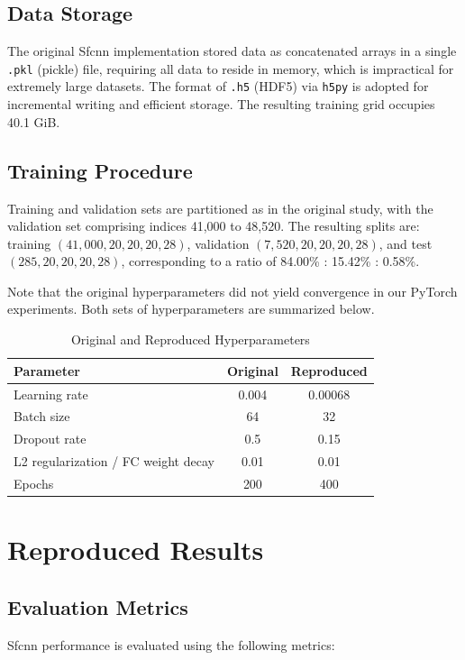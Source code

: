 \documentclass[unnumsec,webpdf,contemporary,large]{oup-authoring-template}
\theoremstyle{thmstyleone}%
\theoremstyle{thmstyletwo}%
\theoremstyle{thmstylethree}%
\begin{document}
\subsection{Data Storage}
The original Sfcnn implementation stored data as concatenated arrays in a single \texttt{.pkl} (pickle) file, requiring all data to reside in memory, which is impractical for extremely large datasets. The format of \texttt{.h5} (HDF5) via \texttt{h5py} is adopted for incremental writing and efficient storage. The resulting training grid occupies 40.1 GiB.

\subsection{Training Procedure}
Training and validation sets are partitioned as in the original study, with the validation set comprising indices 41,000 to 48,520. The resulting splits are: training $(41,000, 20,20,20,28)$, validation $(7,520, 20,20,20,28)$, and test $(285, 20,20,20,28)$, corresponding to a ratio of 84.00\% : 15.42\% : 0.58\%. 

Note that the original hyperparameters did not yield convergence in our PyTorch experiments. Both sets of hyperparameters are summarized below.

\begin{table}[H]
\centering
\caption{Original and Reproduced Hyperparameters}
\label{tab:hyperparams}
\begin{tabular}{lcc}
\toprule
Parameter & Original & Reproduced \\
\midrule
Learning rate & 0.004 & 0.00068 \\
Batch size & 64 & 32 \\
Dropout rate & 0.5 & 0.15 \\
L2 regularization / FC weight decay & 0.01 & 0.01 \\
Epochs & 200 & 400 \\
\bottomrule
\end{tabular}
\end{table}

\section{Reproduced Results}
\label{sec:ReproducedResults}

\subsection{Evaluation Metrics}
Sfcnn performance is evaluated using the following metrics:
\end{document}

